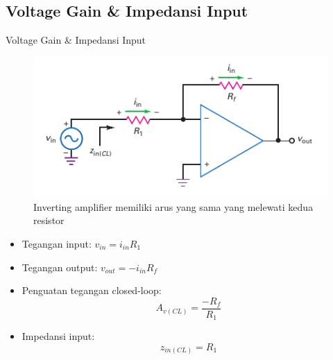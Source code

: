 \subsection{Voltage Gain \& Impedansi Input}
\begin{frame}{Voltage Gain \& Impedansi Input}
	\begin{multicols}{2}
		\begin{figure}
			\centering
			\includegraphics[height=0.4\textheight]{gambar/fig-16.14}
			\caption{Inverting amplifier memiliki arus yang sama yang melewati kedua resistor}
			\label{fig-16.14}
		\end{figure}
	\columnbreak
		\begin{itemize}
			\item Tegangan input: $ v_{in} = i_{in} R_1 $
			\item Tegangan output: $ v_{out} = -i_{in} R_f $
			\item Penguatan tegangan closed-loop:
			\begin{equation}\label{pers.16.3}
				A_{v(CL)} = \frac{-R_f}{R_1}
			\end{equation}
			\item Impedansi input:
			\begin{equation}\label{pers.16.4}
				z_{in(CL)} = R_1
			\end{equation}
		\end{itemize}
	\end{multicols}
\end{frame}

